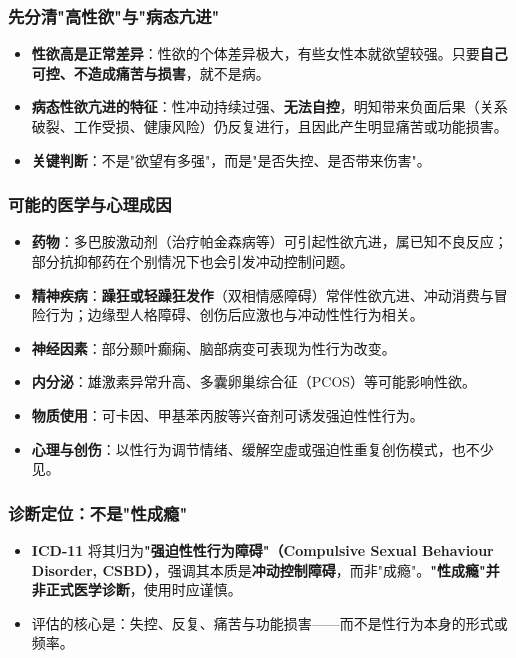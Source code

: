 \subsubsection{先分清"高性欲"与"病态亢进"}

\begin{itemize}
	\item \textbf{性欲高是正常差异}：性欲的个体差异极大，有些女性本就欲望较强。只要\textbf{自己可控、不造成痛苦与损害}，就不是病。
	\item \textbf{病态性欲亢进的特征}：性冲动持续过强、\textbf{无法自控}，明知带来负面后果（关系破裂、工作受损、健康风险）仍反复进行，且因此产生明显痛苦或功能损害。
	\item \textbf{关键判断}：不是"欲望有多强"，而是"是否失控、是否带来伤害"。
\end{itemize}

\subsubsection{可能的医学与心理成因}

\begin{itemize}
	\item \textbf{药物}：多巴胺激动剂（治疗帕金森病等）可引起性欲亢进，属已知不良反应；部分抗抑郁药在个别情况下也会引发冲动控制问题。
	\item \textbf{精神疾病}：\textbf{躁狂或轻躁狂发作}（双相情感障碍）常伴性欲亢进、冲动消费与冒险行为；边缘型人格障碍、创伤后应激也与冲动性性行为相关。
	\item \textbf{神经因素}：部分颞叶癫痫、脑部病变可表现为性行为改变。
	\item \textbf{内分泌}：雄激素异常升高、多囊卵巢综合征（PCOS）等可能影响性欲。
	\item \textbf{物质使用}：可卡因、甲基苯丙胺等兴奋剂可诱发强迫性性行为。
	\item \textbf{心理与创伤}：以性行为调节情绪、缓解空虚或强迫性重复创伤模式，也不少见。
\end{itemize}

\subsubsection{诊断定位：不是"性成瘾"}

\begin{itemize}
	\item \textbf{ICD-11} 将其归为\textbf{"强迫性性行为障碍"（Compulsive Sexual Behaviour Disorder, CSBD）}，强调其本质是\textbf{冲动控制障碍}，而非"成瘾"。\textbf{"性成瘾"并非正式医学诊断}，使用时应谨慎。
	\item 评估的核心是：失控、反复、痛苦与功能损害——而不是性行为本身的形式或频率。
\end{itemize}

